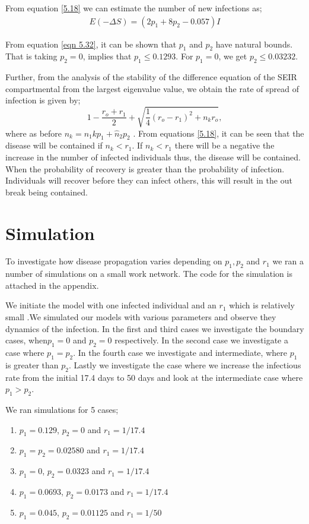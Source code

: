  From equation \ref{5.18} we can estimate the number of new infections as;
\begin{align}
E(- \Delta S) = (2 p_1 + 8 p_2 - 0.057) I  \label{5.1.9}
\end{align}
 
From equation \ref{eqn 5.32}, it can be shown that $p_1$ and $p_2$ have natural bounds. That is taking $p_2 = 0$, implies that $p_1 \leq 0.1293$. For $p_1 = 0$, we get $p_2 \leq 0.03232$.

Further, from the analysis of the stability of the difference equation of the SEIR compartmental from the largest eigenvalue value, we obtain  the rate of spread of infection is given by;
\begin{equation}
1- \dfrac{r_o + r_1}{2} + \sqrt{\dfrac{1}{4}(r_o - r_1)^2 + n_k r_o} \label{eqn 5.3.10},
\end{equation}
where as before $n_k = n_1kp_1 + \widehat{n}_2 p_2$ \citep{fu2013propagation}.
From equations \ref{5.18}, it can be seen that the disease will be contained if $n_k < r_1$. If $n_k < r_1$ there will be a negative the increase in the number of infected individuals thus, the disease will be contained. When the probability of recovery is greater than the probability of infection. Individuals will recover before they can infect others, this will result in the out break being contained.

\section{Simulation}
To investigate how disease propagation varies depending on $p_1, p_2 $ and $r_1$ we ran a number of simulations on a small work network. The code for the simulation is attached in the appendix. 

We initiate the model with one infected individual and an $r_1$ which is relatively small .We simulated our models with various parameters and observe they dynamics  of the infection. 
In the first  and third cases we investigate the boundary cases, when$p_1 = 0$ and  $p_2 = 0$ respectively.  In the second case we investigate a case where $p_1 = p_2$. In the  fourth case we investigate and intermediate, where $p_1$ is greater than $p_2$. Lastly we investigate the case where we increase the infectious rate from the initial 17.4 days to 50 days and look at the intermediate case where $p_1 > p_2$. 


We ran simulations for 5 cases;
\begin{enumerate}
\item $p_1 = 0.129$, $p_2 =0$ and $r_1 = 1/17.4$
\item $p_1 = p_2 = 0.02580$ and $r_1 = 1/17.4$ 
\item $p_1 =0 $, $p_2 = 0.0323$ and $r_1 = 1/17.4$
\item $p_1 = 0.0693$, $p_2 = 0.0173$ and $r_1 = 1/17.4$
\item $p_1 = 0.045$, $p_2 = 0.01125$ and $r_1 = 1/50$
\end{enumerate}


